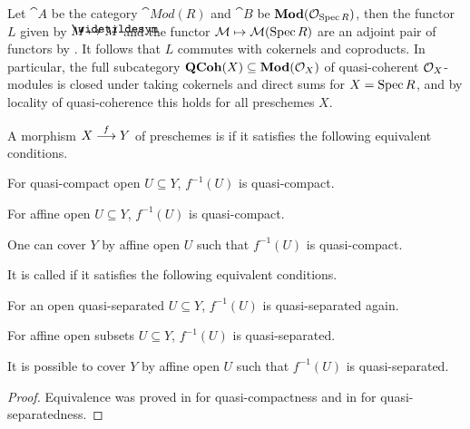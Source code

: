 \documentclass[a4paper,parskip=half,numbers=enddot, DIV=12]{scrreprt}
\begin{document}
Let ${\cat A}$ be the category $\cat{Mod}(R)$ and ${\cat B}$ be $\cat{Mod}(\Oo_{\Spec R})$, then the functor $L$ given by $M\mapsto\snake{M}$ and the functor $\mathcal{M}\mapsto\mathcal{M}(\operatorname{Spec} R)$ are an adjoint pair of functors by . It follows that $L$ commutes with cokernels and coproducts. In particular, the full subcategory $\cat{QCoh}(X)\subseteq\cat{Mod}(\Oo_X)$ of quasi-coherent $\mathcal{O}_X$-modules is closed under taking cokernels and direct sums for $X=\operatorname{Spec} R$, and by locality of quasi-coherence this holds for all preschemes $X$.
\begin{defi}
	A morphism $X\morphism[f]Y$ of preschemes is  if it satisfies the following equivalent conditions.
	\begin{alphanumerate}
		\item For quasi-compact open $U\subseteq Y$, $f^{-1}(U)$ is quasi-compact.
		\item For affine open $U\subseteq Y$, $f^{-1}(U)$ is quasi-compact.
		\item One can cover $Y$ by affine open $U$ such that $f^{-1}(U)$ is quasi-compact.
	\end{alphanumerate}
	It is called  if it satisfies the following equivalent conditions.
	\begin{alphanumerate}\setcounter{enumi}{3}
		\item For an open quasi-separated $U\subseteq Y$, $f^{-1}(U)$ is quasi-separated again.
		\item For affine open subsets $U\subseteq Y$, $f^{-1}(U)$ is quasi-separated.
		\item It is possible to cover $Y$ by affine open $U$ such that $f^{-1}(U)$ is quasi-separated.
	\end{alphanumerate}
\end{defi}
\begin{proof}
	Equivalence was proved in \cite[Fact~2.1.1]{alggeo1} for quasi-compactness and in \cite[Lemma~2.1.1]{alggeo1} for quasi-separatedness.
\end{proof}
\end{document}
